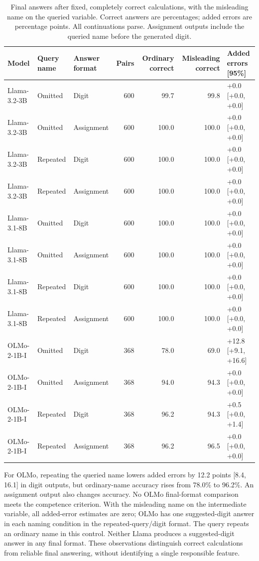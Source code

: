\begin{table}[t]
\centering\small\setlength{\tabcolsep}{4pt}
\begin{tabular}{@{}lllrrrl@{}}
\toprule
Model & Query name & Answer format & Pairs & Ordinary correct & Misleading correct & Added errors [95\%] \\
\midrule
Llama-3.2-3B & Omitted & Digit & 600 & 99.7 & 99.8 & +0.0 [+0.0, +0.0] \\
Llama-3.2-3B & Omitted & Assignment & 600 & 100.0 & 100.0 & +0.0 [+0.0, +0.0] \\
Llama-3.2-3B & Repeated & Digit & 600 & 100.0 & 100.0 & +0.0 [+0.0, +0.0] \\
Llama-3.2-3B & Repeated & Assignment & 600 & 100.0 & 100.0 & +0.0 [+0.0, +0.0] \\
Llama-3.1-8B & Omitted & Digit & 600 & 100.0 & 100.0 & +0.0 [+0.0, +0.0] \\
Llama-3.1-8B & Omitted & Assignment & 600 & 100.0 & 100.0 & +0.0 [+0.0, +0.0] \\
Llama-3.1-8B & Repeated & Digit & 600 & 100.0 & 100.0 & +0.0 [+0.0, +0.0] \\
Llama-3.1-8B & Repeated & Assignment & 600 & 100.0 & 100.0 & +0.0 [+0.0, +0.0] \\
OLMo-2-1B-I & Omitted & Digit & 368 & 78.0 & 69.0 & +12.8 [+9.1, +16.6] \\
OLMo-2-1B-I & Omitted & Assignment & 368 & 94.0 & 94.3 & +0.0 [+0.0, +0.0] \\
OLMo-2-1B-I & Repeated & Digit & 368 & 96.2 & 94.3 & +0.5 [+0.0, +1.4] \\
OLMo-2-1B-I & Repeated & Assignment & 368 & 96.2 & 96.5 & +0.0 [+0.0, +0.0] \\
\bottomrule
\end{tabular}
\caption{Final answers after fixed, completely correct calculations, with the misleading name on the queried variable. Correct answers are percentages; added errors are percentage points. All continuations parse. Assignment outputs include the queried name before the generated digit.}
\label{a-tab:round7-final}
\end{table}
For OLMo, repeating the queried name lowers added errors by 12.2 points [8.4, 16.1] in digit outputs, but ordinary-name accuracy rises from 78.0\% to 96.2\%. An assignment output also changes accuracy. No OLMo final-format comparison meets the competence criterion. With the misleading name on the intermediate variable, all added-error estimates are zero; OLMo has one suggested-digit answer in each naming condition in the repeated-query/digit format. The query repeats an ordinary name in this control. Neither Llama produces a suggested-digit answer in any final format. These observations distinguish correct calculations from reliable final answering, without identifying a single responsible feature.

